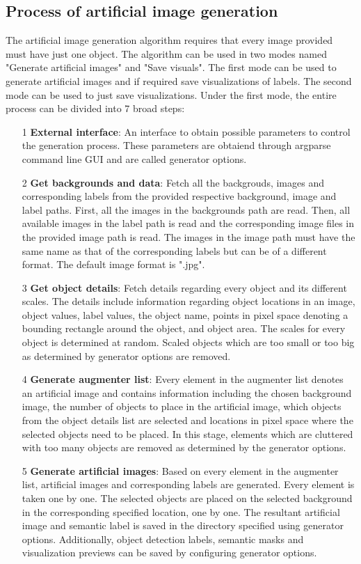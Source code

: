 \subsection{Process of artificial image generation}
The artificial image generation algorithm requires that every image provided must have just one object. The algorithm can be used in two modes named "Generate artificial images" and "Save visuals". The first mode can be used to generate artificial images and if required save visualizations of labels. The second mode can be used to just save visualizations. Under the first mode, the entire process can be divided into 7 broad steps:
	\begin{itemize}
		\item[1] \textbf{External interface}: An interface to obtain possible parameters to control the generation process. These parameters are obtaiend through argparse command line GUI and are called generator options.
		\item[2] \textbf{Get backgrounds and data}: Fetch all the backgrouds, images and corresponding labels from the provided respective background, image and label paths. First, all the images in the backgrounds path are read. Then, all available images in the label path is read and the corresponding image files in the provided image path is read. The images in the image path must have the same name as that of the corresponding labels but can be of a different format. The default image format is ".jpg".
		\item[3] \textbf{Get object details}: Fetch details regarding every object and its different scales. The details include information regarding object locations in an image, object values, label values, the object name, points in pixel space denoting a bounding rectangle around the object, and object area. The scales for every object is determined at random. Scaled objects which are too small or too big as determined by generator options are removed.
		\item[4] \textbf{Generate augmenter list}: Every element in the augmenter list denotes an artificial image and contains information including the chosen background image, the number of objects to place in the artificial image, which objects from the object details list are selected and locations in pixel space where the selected objects need to be placed. In this stage, elements which are cluttered with too many objects are removed as determined by the generator options.
		\item[5] \textbf{Generate artificial images}: Based on every element in the augmenter list, artificial images and corresponding labels are generated. Every element is taken one by one. The selected objects are placed on the selected background in the corresponding specified location, one by one. The resultant artificial image and semantic label is saved in the directory specified using generator options. Additionally, object detection labels, semantic masks and visualization previews can be saved by configuring generator options.

\end{itemize}
